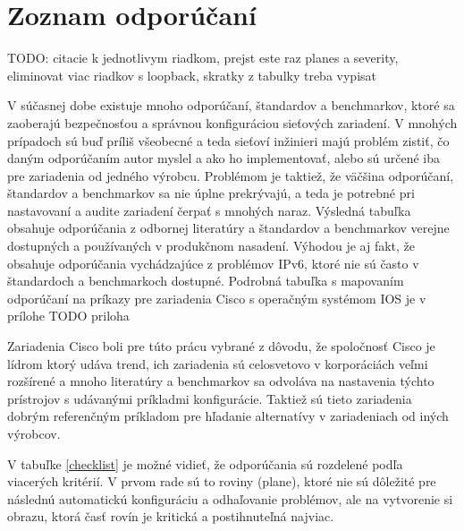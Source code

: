 \section{Zoznam odporúčaní}
 TODO: citacie k jednotlivym riadkom, prejst este raz planes a severity, eliminovat viac riadkov s loopback, skratky z tabulky treba vypisat                                                                                                                                                                                                                                                                                                                                                                                                                                                                                                                                                                                                     

V súčasnej dobe existuje mnoho odporúčaní, štandardov a benchmarkov, ktoré sa zaoberajú bezpečnosťou a správnou konfiguráciou sieťových zariadení. V mnohých prípadoch sú buď príliš všeobecné a teda sieťoví inžinieri majú problém zistiť, čo daným odporúčaním autor myslel a ako ho implementovať, alebo sú určené iba pre zariadenia od jedného výrobcu. Problémom je taktiež, že väčšina odporúčaní, štandardov a benchmarkov sa nie úplne prekrývajú, a teda je potrebné pri nastavovaní a audite zariadení čerpať s mnohých naraz. Výsledná tabuľka obsahuje odporúčania z odbornej literatúry a štandardov a benchmarkov verejne dostupných a používaných v produkčnom nasadení. Výhodou je aj fakt, že obsahuje odporúčania vychádzajúce z problémov IPv6, ktoré nie sú často v štandardoch a benchmarkoch dostupné. Podrobná tabuľka s mapovaním odporúčaní na príkazy pre zariadenia Cisco s operačným systémom IOS je v prílohe TODO priloha %

Zariadenia Cisco boli pre túto prácu vybrané z dôvodu, že spoločnosť Cisco je lídrom ktorý udáva trend, ich zariadenia sú celosvetovo v korporáciách veľmi rozšírené a mnoho literatúry a benchmarkov sa odvoláva na nastavenia týchto prístrojov s udávanými príkladmi konfigurácie. Taktiež sú tieto zariadenia dobrým referenčným príkladom pre hľadanie alternatívy v zariadeniach od iných výrobcov.

V tabuľke \ref{checklist} je možné vidieť, že odporúčania sú rozdelené podľa viacerých kritérií. V prvom rade sú to roviny (plane), ktoré nie sú dôležité pre následnú automatickú konfiguráciu a odhaľovanie problémov, ale na vytvorenie si obrazu, ktorá časť rovín je kritická a postihnuteľná najviac. 

